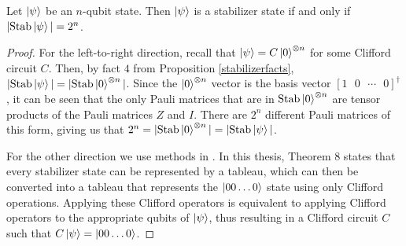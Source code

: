 \documentclass[12pt]{dalthesis}
\begin{document}
\begin{theorem}
\label{stabstate}
Let $\ket{\psi}$ be an $n$-qubit state. Then $\ket{\psi}$ is a stabilizer state if and only if $|\mathrm{Stab} \ket{\psi}| = 2^n$. 
\end{theorem}
\begin{proof}
For the left-to-right direction, recall that $\ket{\psi} = C\ket{0}^{\otimes n}$ for some Clifford circuit $C$. Then, by fact $4$ from Proposition \ref{stabilizerfacts}, $|\mathrm{Stab} \ket{\psi}| = |\mathrm{Stab} \ket{0}^{\otimes n}|$. Since the $\ket{0}^{\otimes n}$ vector is the basis vector $[1 \mbox{ } 0 \mbox{ } \cdots \mbox{ } 0]^\dagger$, it can be seen that the only Pauli matrices that are in $\mathrm{Stab} \ket{0}^{\otimes n}$ are tensor products of the Pauli matrices $Z$ and $I$. There are $2^n$ different Pauli matrices of this form, giving us that $2^n = |\mathrm{Stab} \ket{0}^{\otimes n}| = |\mathrm{Stab} \ket{\psi}|$.



For the other direction we use methods in \cite{Aaronson_2004}. In this thesis,  Theorem 8 states that every stabilizer state can be represented by a tableau, which can then be converted into a tableau that represents the $\ket{00 \dots 0}$ state using only Clifford operations. Applying these Clifford operators is equivalent to applying Clifford operators to the appropriate qubits of $\ket{\psi}$, thus resulting in a Clifford circuit $C$ such that $C\ket{\psi} = \ket{00 \dots 0}$. 
\end{proof}
\end{document}
